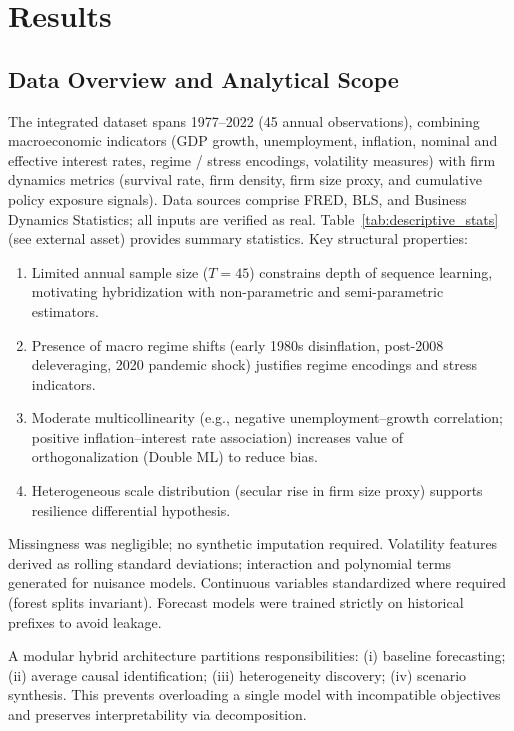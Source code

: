 \section{Results}\label{sec:results}

\subsection{Data Overview and Analytical Scope}
The integrated dataset spans 1977--2022 (45 annual observations), combining macroeconomic indicators (GDP growth, unemployment, inflation, nominal and effective interest rates, regime / stress encodings, volatility measures) with firm dynamics metrics (survival rate, firm density, firm size proxy, and cumulative policy exposure signals). Data sources comprise FRED, BLS, and Business Dynamics Statistics; all inputs are verified as real. Table~\ref{tab:descriptive_stats} (see external asset) provides summary statistics. Key structural properties:
\begin{enumerate}
  \item Limited annual sample size ($T=45$) constrains depth of sequence learning, motivating hybridization with non-parametric and semi-parametric estimators.
  \item Presence of macro regime shifts (early 1980s disinflation, post-2008 deleveraging, 2020 pandemic shock) justifies regime encodings and stress indicators.
  \item Moderate multicollinearity (e.g., negative unemployment--growth correlation; positive inflation--interest rate association) increases value of orthogonalization (Double ML) to reduce bias.
  \item Heterogeneous scale distribution (secular rise in firm size proxy) supports resilience differential hypothesis.
\end{enumerate}
Missingness was negligible; no synthetic imputation required. Volatility features derived as rolling standard deviations; interaction and polynomial terms generated for nuisance models. Continuous variables standardized where required (forest splits invariant). Forecast models were trained strictly on historical prefixes to avoid leakage.

A modular hybrid architecture partitions responsibilities: (i) baseline forecasting; (ii) average causal identification; (iii) heterogeneity discovery; (iv) scenario synthesis. This prevents overloading a single model with incompatible objectives and preserves interpretability via decomposition.

